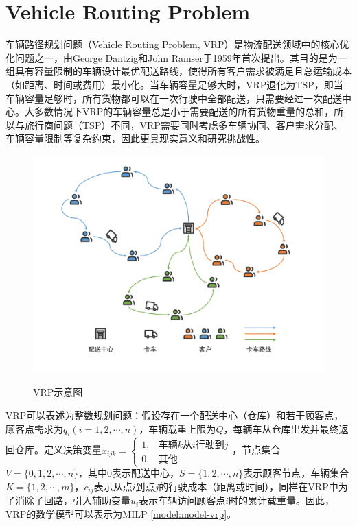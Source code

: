 \part{Vehicle Routing Problem}
车辆路径规划问题（Vehicle Routing Problem, VRP）是物流配送领域中的核心优化问题之一，由George Dantzig和John Ramser于1959年首次提出\cite{1959The}。其目的是为一组具有容量限制的车辆设计最优配送路线，使得所有客户需求被满足且总运输成本（如距离、时间或费用）最小化。当车辆容量足够大时，VRP退化为TSP，即当车辆容量足够时，所有货物都可以在一次行驶中全部配送，只需要经过一次配送中心。大多数情况下VRP的车辆容量总是小于需要配送的所有货物重量的总和，所以与旅行商问题（TSP）不同，VRP需要同时考虑多车辆协同、客户需求分配、车辆容量限制等复杂约束，因此更具现实意义和研究挑战性。

\begin{figure}[!htb]
    \centering
    \includegraphics[width=\linewidth]{images/VRP.pdf}\\
    \caption{VRP示意图}
\end{figure}

VRP可以表述为整数规划问题\cite{2014Vehicle}：假设存在一个配送中心（仓库）和若干顾客点，顾客点需求为$q_i(i = 1,2,\cdots,n)$，车辆载重上限为$Q$，每辆车从仓库出发并最终返回仓库。定义决策变量$x_{ijk} = \begin{cases}1, & \text{车辆$k$从$i$行驶到$j$}\\0, & \text{其他} \end{cases}$，节点集合$V = \{0, 1, 2, \cdots, n\}$，其中0表示配送中心，$S = \{1,2,\cdots,n\}$表示顾客节点，车辆集合$K = \{1,2,\cdots,m\}$，$c_{ij}$表示从点$i$到点$j$的行驶成本（距离或时间），同样在VRP中为了消除子回路，引入辅助变量$u_i$表示车辆访问顾客点$i$时的累计载重量。因此，VRP的数学模型可以表示为MILP \ref{model:model-vrp}。

